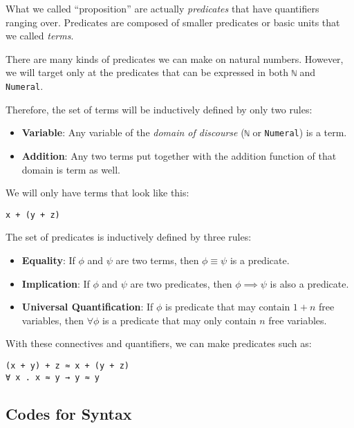 \documentclass[\main/thesis.tex]{subfiles}
\begin{document}
What we called ``proposition'' are actually \textit{predicates} that have
quantifiers ranging over. Predicates are composed of smaller predicates or
basic units that we called \textit{terms}.

There are many kinds of predicates we can make on natural numbers.
However, we will target only at the predicates that can be expressed in both
\lstinline|ℕ| and \lstinline|Numeral|.

Therefore, the set of terms will be inductively defined by only two rules:
\begin{itemize}
    \item \textbf{Variable}: Any variable of the \textit{domain of discourse} (\lstinline|ℕ| or
        \lstinline|Numeral|) is a term.
    \item \textbf{Addition}: Any two terms put together with the addition function
        of that domain is term as well.
\end{itemize}

We will only have terms that look like this:

\begin{lstlisting}
x + (y + z)
\end{lstlisting}

The set of predicates is inductively defined by three rules:

\begin{itemize}
    \item \textbf{Equality}: If $\phi$ and $\psi$ are two terms, then
        $ \phi \equiv \psi $ is a predicate.
    \item \textbf{Implication}: If $\phi$ and $\psi$ are two predicates, then
        $ \phi \implies \psi $ is also a predicate.
    \item \textbf{Universal Quantification}: If $\phi$ is predicate that may
        contain $ 1 + n $ free variables, then $ \forall \phi $ is a predicate that
        may only contain $ n $ free variables.
\end{itemize}

With these connectives and quantifiers, we can make predicates such as:

\begin{lstlisting}
(x + y) + z ≈ x + (y + z)
∀ x . x ≈ y → y ≈ y
\end{lstlisting}

\subsection{Codes for Syntax}
\end{document}
